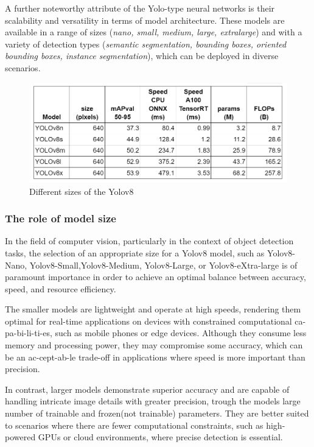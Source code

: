A further noteworthy attribute of the Yolo-type neural networks is their scalability and versatility in terms of model architecture.
These models are available in a range of sizes (\textit{nano, small, medium, large, extralarge}) and with a variety of detection types (\textit{semantic segmentation, bounding boxes,
oriented bounding boxes, instance segmentation}), which can be deployed in diverse scenarios.




\begin{figure}[ht]
\includegraphics[width=1.0\textwidth]{figures/table1}
\caption{Different sizes of the Yolov8~\cite{githubGitHubUltralyticsultralytics}}
\label{fig:tableofsizes}
\end{figure}

\subsubsection{The role of model size}\label{subsubsec:model-size}
In the field of computer vision, particularly in the context of object detection tasks, the selection of an appropriate size for a
Yolov8 model, such as Yolov8-Nano, Yolov8-Small,Yolov8-Medium,  Yolov8-Large, or Yolov8-eXtra-large is of paramount importance in order to achieve an optimal balance between accuracy, speed, and resource efficiency.

The smaller models are lightweight and operate at high speeds, rendering them optimal for real-time applications on devices with constrained computational ca-pa-bi-li-ti-es, such as mobile phones or edge devices.
Although they consume less memory and processing power, they may compromise some accuracy, which can be an ac-cept-ab-le trade-off in applications where speed is more important than precision.

In contrast, larger models demonstrate superior accuracy and are capable of handling intricate image details with greater precision, trough the models large number of trainable and frozen(not trainable) parameters.
They are better suited to scenarios where there are fewer computational constraints, such as high-powered GPUs or cloud environments, where precise detection is essential.

